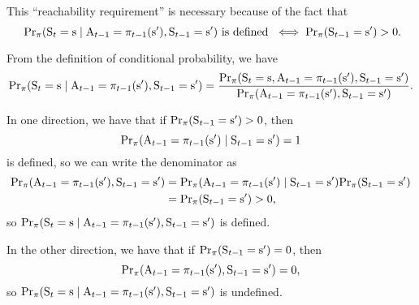 \documentclass{rl_theory/note}
\begin{document}
\begin{note}
  \def\quant{\PSTT(\S_\TT = \SS \mid \A_\TTM = \STT_\TTM(\SS'), \S_\TTM = \SS')}
  This ``reachability requirement'' is necessary
  because of the fact that
  $$\text{ $\quant$ is defined } 
  \iff \PSTT(\S_{\TT - 1} = \SS') > 0.$$%

  From the definition of conditional probability, we have
  $$ \quant 
  = \frac{\PSTT(\S_\TT = \SS, \A_\TTM = \STT_\TTM(\SS'), \S_\TTM = \SS')}
    {\PSTT(\A_\TTM = \STT_\TTM(\SS'), \S_\TTM = \SS')}.$$

  In one direction, we have that if ${\rm Pr}_{\pi}({\rm S}_{t - 1} = {\rm s}') > 0$, then 
  $${\rm Pr}_{\pi}({\rm A}_{t - 1} = \pi_{t - 1}({\rm s}')\mid {\rm S}_{t - 1} = {\rm s}') = 1$$ 
  is defined, so
  we can write the denominator as
  \begin{align*}
    {\rm Pr}_{\pi}({\rm A}_{t - 1} = \pi_{t - 1}({\rm s}'), {\rm S}_{t - 1} = {\rm s}') &= {\rm Pr}_{\pi}({\rm A}_{t - 1} = \pi_{t - 1}({\rm s}')\mid {\rm S}_{t - 1} = {\rm s}')
    {\rm Pr}_{\pi}({\rm S}_{t - 1} = {\rm s}')\\
                                                     &= {\rm Pr}_{\pi}({\rm S}_{t - 1} = {\rm s}') > 0,
  \end{align*}
  so $\quant$ is defined.

  In the other direction, we have that if ${\rm Pr}_{\pi}({\rm S}_{t - 1} = {\rm s}') = 0$, then 
  $$ {\rm Pr}_{\pi}({\rm A}_{t - 1} = \pi_{t - 1}({\rm s}'), {\rm S}_{t - 1} = {\rm s}') = 0,$$ 
  so $\quant$
  is undefined.
\end{note}
\end{document}
